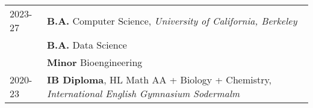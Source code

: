 

\renewcommand{\thefootnote}{\fnsymbol{footnote}}
\setcounter{footnote}{0}

\begin{longtable}[l]{@{}p{} p{}}

    2023-27\footnotemark & \textbf{B.A.} Computer Science, \emph{University of California, Berkeley} \\

    & \textbf{B.A.} Data Science\\

    & \textbf{Minor} Bioengineering\\

    2020-23 & \textbf{IB Diploma}, HL Math AA + Biology + Chemistry, \emph{International English Gymnasium Sodermalm} \\
\end{longtable}



\renewcommand{\thefootnote}{\arabic{footnote}}
\setcounter{footnote}{1}

